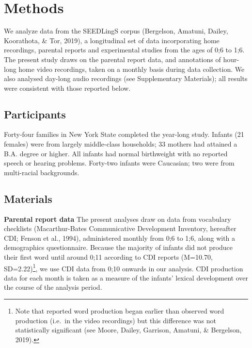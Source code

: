 \documentclass[
  english,
  man,floatsintext]{apa6}
\begin{document}
\hypertarget{methods}{%
\section{Methods}\label{methods}}

We analyze data from the SEEDLingS corpus (Bergelson, Amatuni, Dailey, Koorathota, \& Tor, 2019), a longitudinal set of data incorporating home recordings, parental reports and experimental studies from the ages of 0;6 to 1;6. The present study draws on the parental report data, and annotations of hour-long home video recordings, taken on a monthly basis during data collection. We also analysed day-long audio recordings (see Supplementary Materials); all results were consistent with those reported below.

\hypertarget{participants}{%
\subsection{Participants}\label{participants}}

Forty-four families in New York State completed the year-long study. Infants (21 females) were from largely middle-class households; 33 mothers had attained a B.A. degree or higher. All infants had normal birthweight with no reported speech or hearing problems. Forty-two infants were Caucasian; two were from multi-racial backgrounds.

\hypertarget{materials}{%
\subsection{Materials}\label{materials}}

\textbf{Parental report data} The present analyses draw on data from vocabulary checklists (Macarthur-Bates Communicative Development Inventory, hereafter CDI; Fenson et al., 1994), administered monthly from 0;6 to 1;6, along with a demographics questionnaire. Because the majority of infants did not produce their first word until around 0;11 according to CDI reports (M=10.70, SD=2.22)\footnote{Note that reported word production began earlier than observed word production (i.e.~in the video recordings) but this difference was not statistically significant (see Moore, Dailey, Garrison, Amatuni, \& Bergelson, 2019).}, we use CDI data from 0;10 onwards in our analysis. CDI production data for each month is taken as a measure of the infants' lexical development over the course of the analysis period.
\end{document}
